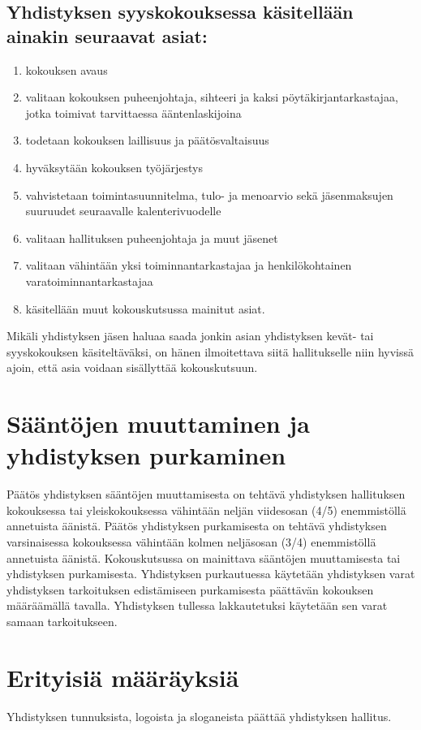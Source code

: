 \documentclass[a4paper, 12pt, finnish]{scrartcl}
\begin{document}
\subsection*{Yhdistyksen syyskokouksessa käsitellään ainakin seuraavat asiat:}
\begin{enumerate}
  \item kokouksen avaus
  \item valitaan kokouksen puheenjohtaja, sihteeri ja kaksi pöytäkirjantarkastajaa, jotka toimivat tarvittaessa ääntenlaskijoina
  \item todetaan kokouksen laillisuus ja päätösvaltaisuus
  \item hyväksytään kokouksen työjärjestys
  \item vahvistetaan toimintasuunnitelma, tulo- ja menoarvio sekä jäsenmaksujen suuruudet seuraavalle kalenterivuodelle
  \item valitaan hallituksen puheenjohtaja ja muut jäsenet
  \item valitaan vähintään yksi toiminnantarkastajaa ja henkilökohtainen varatoiminnantarkastajaa
  \item käsitellään muut kokouskutsussa mainitut asiat.
\end{enumerate}

Mikäli yhdistyksen jäsen haluaa saada jonkin asian yhdistyksen kevät- tai syyskokouksen käsiteltäväksi, on hänen ilmoitettava siitä hallitukselle niin hyvissä ajoin, että asia voidaan sisällyttää kokouskutsuun.

\section{Sääntöjen muuttaminen ja yhdistyksen purkaminen}
Päätös yhdistyksen sääntöjen muuttamisesta on tehtävä yhdistyksen hallituksen kokouksessa tai yleiskokouksessa vähintään neljän viidesosan (4/5) enemmistöllä annetuista äänistä.
Päätös yhdistyksen purkamisesta on tehtävä yhdistyksen varsinaisessa kokouksessa vähintään kolmen neljäsosan (3/4) enemmistöllä annetuista äänistä.
Kokouskutsussa on mainittava sääntöjen muuttamisesta tai yhdistyksen purkamisesta.
Yhdistyksen purkautuessa käytetään yhdistyksen varat yhdistyksen tarkoituksen edistämiseen purkamisesta päättävän kokouksen määräämällä tavalla.
Yhdistyksen tullessa lakkautetuksi käytetään sen varat samaan tarkoitukseen.

\section{Erityisiä määräyksiä}
Yhdistyksen tunnuksista, logoista ja sloganeista päättää yhdistyksen hallitus.
\end{document}
